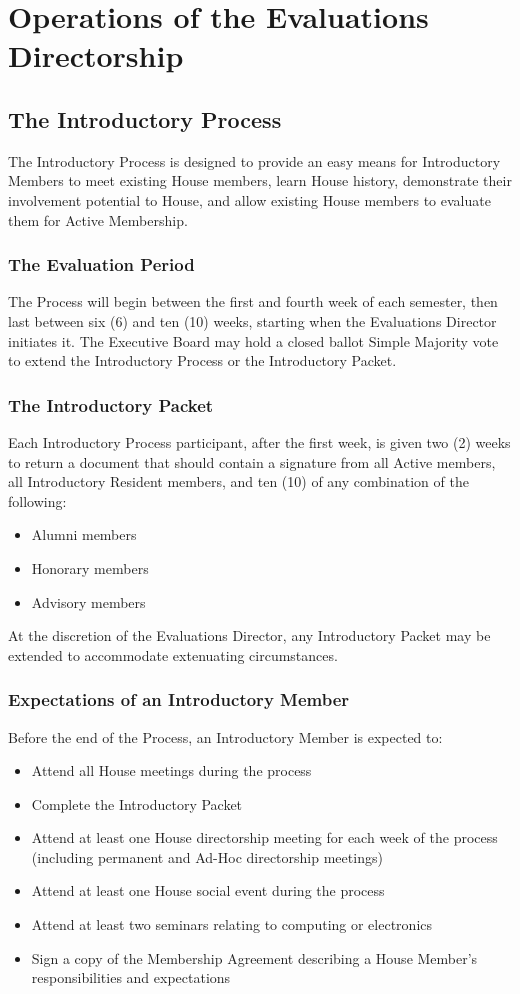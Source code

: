 \documentclass{article}
\newcommand{\bylaw}[1]{\section{#1} \label{#1}}
\newcommand{\bsection}[1]{\subsection{#1} \label{#1}}
\newcommand{\bsubsection}[1]{\subsubsection{#1} \label{#1}}
\begin{document}
\bylaw{Operations of the Evaluations Directorship}
\bsection{The Introductory Process}
The Introductory Process is designed to provide an easy means for Introductory Members to meet existing House members, learn House history, demonstrate their involvement potential to House, and allow existing House members to evaluate them for Active Membership.
\bsubsection{The Evaluation Period}
The Process will begin between the first and fourth week of each semester, then last between six (6) and ten (10) weeks, starting when the Evaluations Director initiates it.
The Executive Board may hold a closed ballot Simple Majority vote to extend the Introductory Process or the Introductory Packet.
\bsubsection{The Introductory Packet}
Each Introductory Process participant, after the first week, is given two (2) weeks to return a document that should contain a signature from all Active members, all Introductory Resident members, and ten (10) of any combination of the following:
\begin{itemize}
	\item Alumni members
	\item Honorary members
	\item Advisory members
\end{itemize}
At the discretion of the Evaluations Director, any Introductory Packet may be extended to accommodate extenuating circumstances.
\bsubsection{Expectations of an Introductory Member}
Before the end of the Process, an Introductory Member is expected to:
\begin{itemize}
\item Attend all House meetings during the process
\item Complete the Introductory Packet
\item Attend at least one House directorship meeting for each week of the process (including permanent and Ad-Hoc directorship meetings)
\item Attend at least one House social event during the process
\item Attend at least two seminars relating to computing or electronics
\item Sign a copy of the Membership Agreement describing a House Member’s responsibilities and expectations
\end{itemize}
\end{document}
